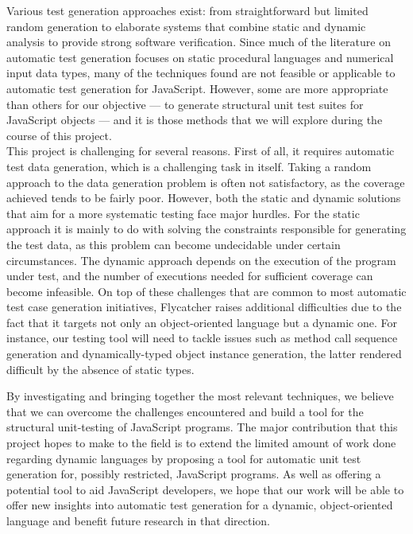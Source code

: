 \documentclass[a4paper,11pt,titlepage]{report}
\begin{document}
Various test generation approaches exist: from straightforward but limited random generation to elaborate systems that combine static and dynamic analysis to provide strong software verification. Since much of the literature on automatic test generation focuses on static procedural languages and numerical input data types, many of the techniques found are not feasible or applicable to automatic test generation for JavaScript. However, some are more appropriate than others for our objective --- to generate structural unit test suites for JavaScript objects --- and it is those methods that we will explore during the course of this project.\\

This project is challenging for several reasons. First of all, it requires automatic test data generation, which is a challenging task in itself. Taking a random approach to the data generation problem is often not satisfactory, as the coverage achieved tends to be fairly poor. However, both the static and dynamic solutions that aim for a more systematic testing face major hurdles. For the static approach it is mainly to do with solving the constraints responsible for generating the test data, as this problem can become undecidable under certain circumstances. The dynamic approach depends on the execution of the program under test, and the number of executions needed for sufficient coverage can become infeasible. On top of these challenges that are common to most automatic test case generation initiatives, Flycatcher raises additional difficulties due to the fact that it targets not only an object-oriented language but a dynamic one. For instance, our testing tool will need to tackle issues such as method call sequence generation and dynamically-typed object instance generation, the latter rendered difficult by the absence of static types.

By investigating and bringing together the most relevant techniques, we believe that we can overcome the challenges encountered and build a tool for the structural unit-testing of JavaScript programs. The major contribution that this project hopes to make to the field is to extend the limited amount of work done regarding dynamic languages by proposing a tool for automatic unit test generation for, possibly restricted, JavaScript programs. As well as offering a potential tool to aid JavaScript developers, we hope that our work will be able to offer new insights into automatic test generation for a dynamic, object-oriented language and benefit future research in that direction.
\end{document}
